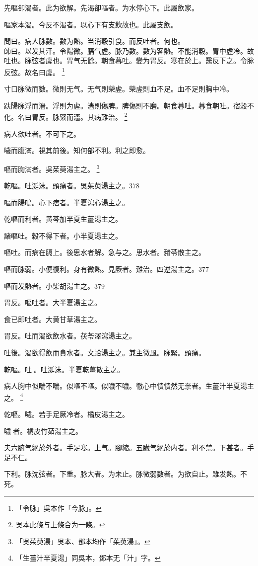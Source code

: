 先嘔卻渴者。此为欲解。先渴卻嘔者。为水停心下。此屬飲家。

嘔家本渴。今反不渴者。以心下有支飲故也。此屬支飲。

問曰。病人脉數。數为熱。当消穀引食。而反吐者。何也。\\
師曰。以发其汗。令陽微。膈气虗。脉乃數。數为客熱。不能消穀。胃中虗冷。故吐也。脉弦者虗也。胃气无餘。朝食暮吐。變为胃反。寒在於上。醫反下之。令脉反弦。故名曰虗。
	\footnote{
		「令脉」吳本作「今脉」。
	}

寸口脉微而數。微則无气。无气則榮虗。榮虗則血不足。血不足則胸中冷。

趺陽脉浮而濇。浮則为虗。濇則傷脾。脾傷則不磨。朝食暮吐。暮食朝吐。宿穀不化。名曰胃反。脉緊而濇。其病難治。
	\footnote{
		吳本此條与上條合为一條。
	}

病人欲吐者。不可下之。

噦而腹滿。視其前後。知何部不利。利之即愈。

嘔而胸滿者。{\khaai 吳}茱萸湯主之。
	\footnote{
		「吳茱萸湯」吳本、鄧本均作「茱萸湯」。
	}

乾嘔。吐涎沫。頭痛者。吳茱萸湯主之。378

嘔而腸鳴。心下痞者。半夏瀉心湯主之。

乾嘔而利者。黄芩加半夏生薑湯主之。

諸嘔吐。穀不得下者。小半夏湯主之。

嘔吐。而病在膈上。後思水者解。急与之。思水者。豬苓散主之。

嘔而脉弱。小便復利。身有微熱。見厥者。難治。四逆湯主之。377

嘔而发熱者。小柴胡湯主之。379

胃反。嘔吐者。大半夏湯主之。

食已即吐者。大黄甘草湯主之。

胃反。吐而渴欲飲水者。茯苓澤瀉湯主之。

吐後。渴欲得飲而貪水者。文蛤湯主之。兼主微風。脉緊。頭痛。

乾嘔。吐{\sungii 𠱘}。吐涎沫。半夏乾薑散主之。

病人胸中似喘不喘。似嘔不嘔。似噦不噦。徹心中憒憒然无奈者。生薑汁半夏湯主之。
	\footnote{
		「生薑汁半夏湯」同吳本，鄧本无「汁」字。
	}

乾嘔。噦。若手足厥{\khaai 冷}者。橘皮湯主之。

噦{\sungii 𠱘}者。橘皮竹茹湯主之。

夫六腑气絕於外者。手足寒。上气。腳縮。五臓气絕於内者。利不禁。下甚者。手足不仁。

下利。脉沈弦者。下重。脉大者。为未止。脉微弱數者。为欲自止。雖发熱。不死。

